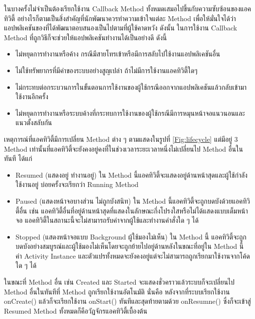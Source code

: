 	ในบางครั้งไม่จำเป็นต้องเรียกใช้งาน Callback Method ทั้งหมดเสมอไปขึ้นกับความซับซ้อนของแอคทิวิตี้ อย่างไรก็ตามเป็นสิ่งสำคัญที่นักพัฒนาควรทำความเข้าใจแต่ละ Method เพื่อให้มั่นใจได้ว่าแอปพลิเคชันของที่ได้พัฒนาตอบสนองเป็นไปตามที่ผู้ใช้คาดหวัง ดังนั้น ในการใช้งาน Callback Method
	ที่ถูกวิธีก็จะช่วยให้แอปพลิเคชันทำงานได้เป็นอย่างดี ดังนี้
	\begin{itemize}
		\item ไม่หยุดการทำงานหรือค้าง กรณีมีสายโทรเข้าหรือมีการสลับไปใช้งานแอปพลิเคชันอื่น 
		\item ไม่ใช้ทรัพยากรที่มีค่าของระบบอย่างสูญเปล่า ถ้าไม่มีการใช้งานแอคทิวิตี้ใดๆ 
		\item ไม่กระทบต่อกระบวนการในขั้นตอนการใช้งานของผู้ใช้กรณีออกจากแอปพลิเคชันแล้วกลับเข้ามาใช้งานอีกครั้ง 
		\item ไม่หยุดการทำงานหรือระบบค้างที่กระทบการใช้งานของผู้ใช้กรณีมีการหมุนหน้าจอแนวนอนและแนวตั้งสลับกัน
	\end{itemize}
	
	เหตุการณ์ที่แอคทิวิตี้มีการเปลี่ยน Method ต่าง ๆ ตามแสดงในรูปที่  \ref{Fig:lifecycle}
	แต่มีอยู่ 3 Method เท่านั้นที่แอคทิวิตี้จะยังคงอยู่คงที่ในช่วงเวลาระยะเวลาหนึ่งไม่เปลี่ยนไป Method อื่นในทันที ได้แก่
		\begin{itemize}
		\item Resumed (แสดงอยู่ ทำงานอยู่) ใน Method นี้แอคทิวิตี้จะแสดงอยู่ด้านหน้าสุดและผู้ใช้กำลังใช้งานอยู่ บ่อยครั้งจะเรียกว่า Running Method
		\item Paused (แสดงหน้าจอบางส่วน ไม่ถูกบังสนิท) ใน Method นี้แอคทิวิตี้จะถูกบดบังด้วยแอคทิวิตี้อื่น เช่น แอคทิวิตี้อื่นที่อยู่ด้านหน้าสุดที่แสดงในลักษณะกึ่งโปรงใสหรือไม่ได้แสดงแบบเต็มหน้าจอ  แอคทิวิตี้ในสถานะนี้จะไม่สามารถรับค่าจากผู้ใช้และทำงานคำสั่งใด ๆ ได้
		\item Stopped (แสดงหน้าจอแบบ Background ผู้ใช้มองไม่เห็น) ใน Method นี้ แอคทิวิตี้จะถูกบดบังอย่างสมบูรณ์และผู้ใช้มองไม่เห็นโดยจะถูกย้ายไปอยู่ด้านหลังในขณะที่อยู่ใน Method นี้
		ค่า Activity Instance และตัวแปรทั้งหมดจะยังคงอยู่แต่จะไม่สามารถถูกเรียกมาใช้งานจากโค้ดใด ๆ ได้
		\end{itemize}
		ในขณะที่ Method อื่น เช่น Created และ Started จะแสดงชั่วคราวแล้วระบบก็จะเปลี่ยนไป Method อื่นในทันทีที่ Method ถูกเรียกใช้งานอัตโนมัติ นั่นคือ หลังจากที่ระบบเรียกใช้งาน onCreate() แล้วก็จะเรียกใช้งาน onStart()
		ทันทีและสุดท้ายตามด้วย onResumne()  ซึ่งก็จะเข้าสู่ Resumed Method ทั้งหมดก็คือวัฏจักรแอคทิวิตี้เบื้องต้น

